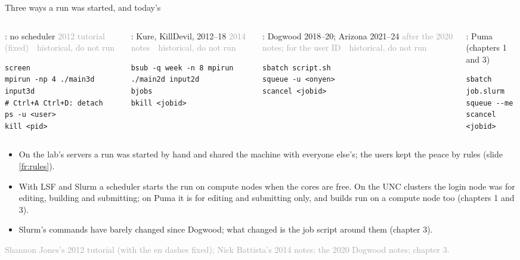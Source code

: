 \documentclass[aspectratio=169,11pt]{beamer}
\newcommand{\sourcecredit}[1]{\vfill\begin{flushright}\tiny\textcolor{DarkGray}{#1}\end{flushright}}
\newcommand{\hist}[1]{{\tiny\sffamily\textcolor{DarkGray}{#1\ \textbullet\ historical, do not run}}\par\nointerlineskip\vspace{0.3mm}}
\begin{document}
\begin{frame}[fragile]{Three ways a run was started, and today's}
\label{fr:threeways}
\begin{columns}[T,onlytextwidth]
\begin{column}{0.235\textwidth}
\scriptsize{}: no scheduler
\hist{2012 tutorial (fixed)}
\begin{lstlisting}[style=hist]
screen
mpirun -np 4 ./main3d input3d
# Ctrl+A Ctrl+D: detach
ps -u <user>
kill <pid>
\end{lstlisting}
\end{column}
\begin{column}{0.235\textwidth}
\scriptsize{}: Kure, KillDevil, 2012--18
\hist{2014 notes}
\begin{lstlisting}[style=hist]
bsub -q week -n 8 mpirun ./main2d input2d
bjobs
bkill <jobid>
\end{lstlisting}
\end{column}
\begin{column}{0.235\textwidth}
\scriptsize{}: Dogwood 2018--20; Arizona 2021--24
\hist{after the 2020 notes;  for the user ID}
\begin{lstlisting}[style=hist]
sbatch script.sh
squeue -u <onyen>
scancel <jobid>
\end{lstlisting}
\end{column}
\begin{column}{0.235\textwidth}
\scriptsize{}: Puma (chapters 1 and 3)
\begin{lstlisting}[style=shell,basicstyle=\ttfamily\tiny\color{BlackGray}]
sbatch job.slurm
squeue --me
scancel <jobid>
\end{lstlisting}
\end{column}
\end{columns}
\vspace{2mm}
\small
\begin{itemize}\setlength{\itemsep}{2pt}
  \item On the lab's servers a run was started by hand and shared the machine with everyone else's; the users kept the peace by rules (slide \ref{fr:rules}).
  \item With LSF and Slurm a scheduler starts the run on compute nodes when the cores are free. On the UNC clusters the login node was for editing, building and submitting; on Puma it is for editing and submitting only, and builds run on a compute node too (chapters 1 and 3).
  \item Slurm's commands have barely changed since Dogwood; what changed is the job script around them (chapter 3).
\end{itemize}
\sourcecredit{Shannon Jones's 2012 tutorial (with the en dashes fixed); Nick Battista's 2014 notes; the 2020 Dogwood notes; chapter 3.}
\end{frame}
\end{document}
